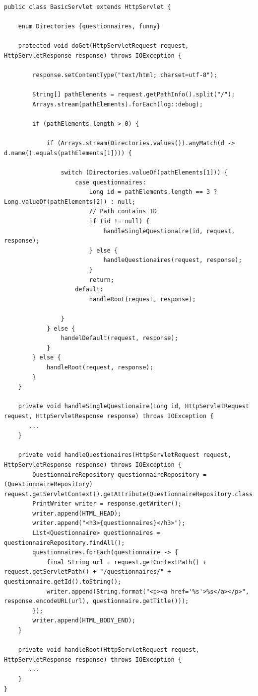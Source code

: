\begin{verbatim}
public class BasicServlet extends HttpServlet {

    enum Directories {questionnaires, funny}

    protected void doGet(HttpServletRequest request, HttpServletResponse response) throws IOException {

        response.setContentType("text/html; charset=utf-8");

        String[] pathElements = request.getPathInfo().split("/");
        Arrays.stream(pathElements).forEach(log::debug);

        if (pathElements.length > 0) {

            if (Arrays.stream(Directories.values()).anyMatch(d -> d.name().equals(pathElements[1]))) {

                switch (Directories.valueOf(pathElements[1])) {
                    case questionnaires:
                        Long id = pathElements.length == 3 ? Long.valueOf(pathElements[2]) : null;
                        // Path contains ID
                        if (id != null) {
                            handleSingleQuestionaire(id, request, response);
                        } else {
                            handleQuestionaires(request, response);
                        }
                        return;
                    default:
                        handleRoot(request, response);

                }
            } else {
                handelDefault(request, response);
            }
        } else {
            handleRoot(request, response);
        }
    }

    private void handleSingleQuestionaire(Long id, HttpServletRequest request, HttpServletResponse response) throws IOException {
       ...
    }

    private void handleQuestionaires(HttpServletRequest request, HttpServletResponse response) throws IOException {
        QuestionnaireRepository questionnaireRepository = (QuestionnaireRepository) request.getServletContext().getAttribute(QuestionnaireRepository.class.getName());
        PrintWriter writer = response.getWriter();
        writer.append(HTML_HEAD);
        writer.append("<h3>{questionnaires}</h3>");
        List<Questionnaire> questionnaires = questionnaireRepository.findAll();
        questionnaires.forEach(questionnaire -> {
            final String url = request.getContextPath() + request.getServletPath() + "/questionnaires/" + questionnaire.getId().toString();
            writer.append(String.format("<p><a href='%s'>%s</a></p>", response.encodeURL(url), questionnaire.getTitle()));
        });
        writer.append(HTML_BODY_END);
    }

    private void handleRoot(HttpServletRequest request, HttpServletResponse response) throws IOException {
       ...
    }
}
\end{verbatim}
